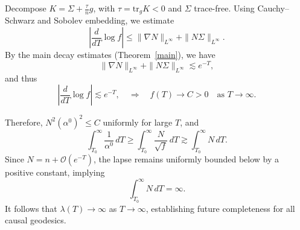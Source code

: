 \documentclass{amsart}
\begin{document}
\noindent Decompose $K = \Sigma + \tfrac{\tau}{n} g$, with $\tau = \mathrm{tr}_g K < 0$ and $\Sigma$ trace-free. Using Cauchy--Schwarz and Sobolev embedding, we estimate
\[
\left| \frac{d}{dT} \log f \right| \leq \| \nabla N \|_{L^\infty} + \| N \Sigma \|_{L^\infty}.
\]
By the main decay estimates (Theorem~\ref{main}), we have
\[
\| \nabla N \|_{L^\infty} + \| N \Sigma \|_{L^\infty} \lesssim e^{-T},
\]
and thus
\[
\left| \frac{d}{dT} \log f \right| \lesssim e^{-T}, \quad \Rightarrow \quad f(T) \to C > 0 \quad \text{as } T \to \infty.
\]

\noindent Therefore, $N^2 (\alpha^0)^2 \leq C$ uniformly for large $T$, and
\[
\int_{T_0}^\infty \frac{1}{\alpha^0} \, dT \geq \int_{T_0}^\infty \frac{N}{\sqrt{f}} \, dT \gtrsim \int_{T_0}^\infty N \, dT.
\]
Since $N = n + \mathcal{O}(e^{-T})$, the lapse remains uniformly bounded below by a positive constant, implying
\[
\int_{T_0}^\infty N \, dT = \infty.
\]
It follows that $\lambda(T) \to \infty$ as $T \to \infty$, establishing future completeness for all causal geodesics.
\end{document}
